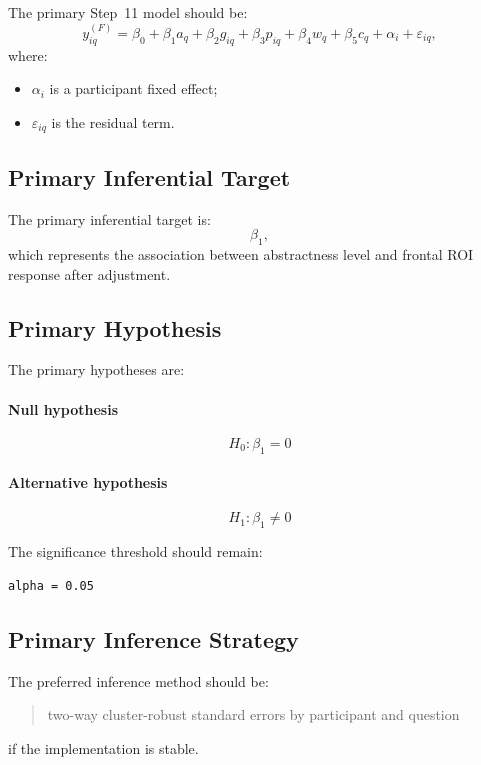 The primary Step~11 model should be:
\begin{equation}
y^{(F)}_{iq}
=
\beta_0
+
\beta_1 a_q
+
\beta_2 g_{iq}
+
\beta_3 p_{iq}
+
\beta_4 w_q
+
\beta_5 c_q
+
\alpha_i
+
\varepsilon_{iq},
\end{equation}
where:
\begin{itemize}
    \item \(\alpha_i\) is a participant fixed effect;
    \item \(\varepsilon_{iq}\) is the residual term.
\end{itemize}

\subsection{Primary Inferential Target}
The primary inferential target is:
\begin{equation}
\beta_1,
\end{equation}
which represents the association between abstractness level and frontal ROI response after adjustment.

\subsection{Primary Hypothesis}
The primary hypotheses are:

\paragraph{Null hypothesis}
\begin{equation}
H_0: \beta_1 = 0
\end{equation}

\paragraph{Alternative hypothesis}
\begin{equation}
H_1: \beta_1 \neq 0
\end{equation}

The significance threshold should remain:
\begin{verbatim}
alpha = 0.05
\end{verbatim}

\subsection{Primary Inference Strategy}
The preferred inference method should be:
\begin{quote}
two-way cluster-robust standard errors by participant and question
\end{quote}
if the implementation is stable.

